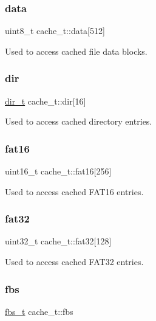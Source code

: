 \subsubsection{\texorpdfstring{data}{data}}
{\footnotesize\ttfamily uint8\+\_\+t cache\+\_\+t\+::data\mbox{[}512\mbox{]}}

Used to access cached file data blocks. \mbox{\label{unioncache__t_a7396fdbdb7c52bd1d72c5329ff32acd1}} 
\subsubsection{\texorpdfstring{dir}{dir}}
{\footnotesize\ttfamily \hyperlink{_fat_structs_8h_a803db59d4e16a0c54a647afc6a7954e3}{dir\+\_\+t} cache\+\_\+t\+::dir\mbox{[}16\mbox{]}}

Used to access cached directory entries. \mbox{\label{unioncache__t_a8f3a4e9392a7d8ace954fc44c57df887}} 
\subsubsection{\texorpdfstring{fat16}{fat16}}
{\footnotesize\ttfamily uint16\+\_\+t cache\+\_\+t\+::fat16\mbox{[}256\mbox{]}}

Used to access cached F\+A\+T16 entries. \mbox{\label{unioncache__t_a57e16421bf460d1ba6cb9ce9a23a4a83}} 
\subsubsection{\texorpdfstring{fat32}{fat32}}
{\footnotesize\ttfamily uint32\+\_\+t cache\+\_\+t\+::fat32\mbox{[}128\mbox{]}}

Used to access cached F\+A\+T32 entries. \mbox{\label{unioncache__t_a0691515e5d969f98c4285bfe0c16a309}} 
\subsubsection{\texorpdfstring{fbs}{fbs}}
{\footnotesize\ttfamily \hyperlink{_fat_structs_8h_a91a3979f1149ff688d0d8bb696bc2887}{fbs\+\_\+t} cache\+\_\+t\+::fbs}

